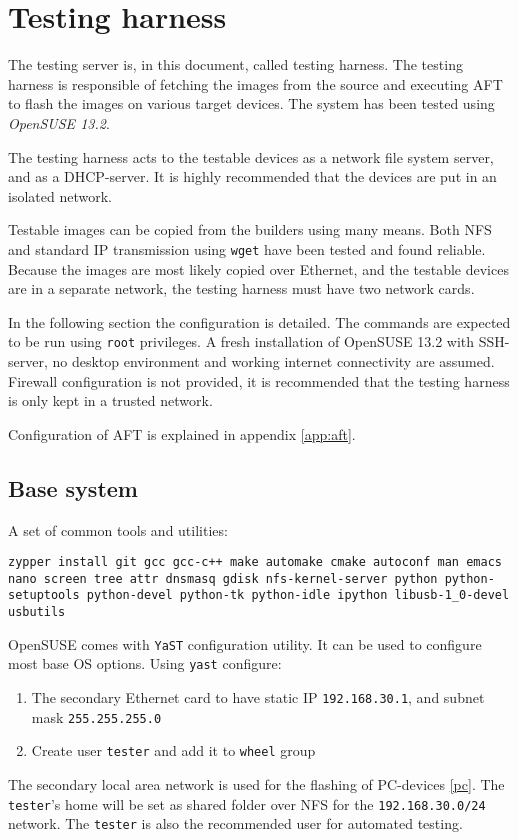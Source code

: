 \documentclass[a4paper,11pt]{article}
\newcommand{\cmd}[1]{\texttt{#1}}
\begin{document}
\section{Testing harness}
\label{testingharness}
The testing server is, in this document, called testing harness. The testing harness is responsible of fetching the images from the source and executing AFT to flash the images on various target devices. The system has been tested using \emph{OpenSUSE 13.2}.

The testing harness acts to the testable devices as a network file system server, and as a DHCP-server. It is highly recommended that the devices are put in an isolated network.

Testable images can be copied from the builders using many means. Both NFS and standard IP transmission using \cmd{wget} have been tested and found reliable. Because the images are most likely copied over Ethernet, and the testable devices are in a separate network, the testing harness must have two network cards.

In the following section the configuration is detailed. The commands are expected to be run using \cmd{root} privileges. A fresh installation of OpenSUSE 13.2 with SSH-server, no desktop environment and working internet connectivity are assumed. Firewall configuration is not provided, it is recommended that the testing harness is only kept in a trusted network.

Configuration of AFT is explained in appendix \ref{app:aft}.

\subsection*{Base system}
A set of common tools and utilities:
\begin{lstlisting}
zypper install git gcc gcc-c++ make automake cmake autoconf man emacs nano screen tree attr dnsmasq gdisk nfs-kernel-server python python-setuptools python-devel python-tk python-idle ipython libusb-1_0-devel usbutils
\end{lstlisting}

OpenSUSE comes with \cmd{YaST} configuration utility. It can be used to configure most base OS options. Using \cmd{yast} configure:
\begin{enumerate}
\item The secondary Ethernet card to have static IP \cmd{192.168.30.1}, and subnet mask \cmd{255.255.255.0}
\item Create user \cmd{tester} and add it to \cmd{wheel} group
\end{enumerate}
The secondary local area network is used for the flashing of PC-devices \ref{pc}. The \cmd{tester}'s  home will be set as shared folder over NFS for the \cmd{192.168.30.0/24} network. The \cmd{tester} is also the recommended user for automated testing.
\end{document}
